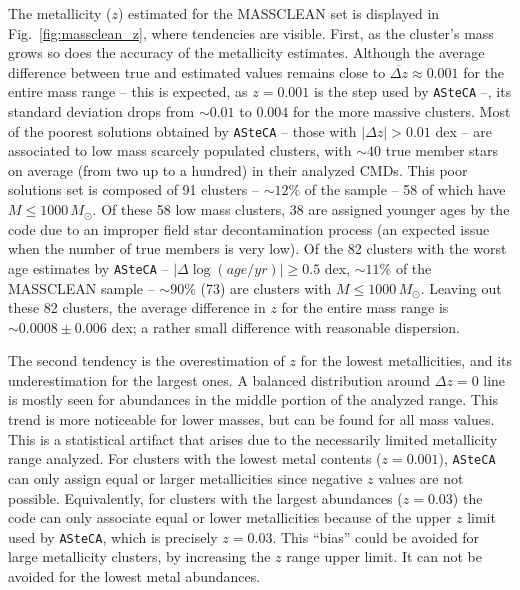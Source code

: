 \documentclass{aa}
\begin{document}
\begin{appendix}
The metallicity ($z$) estimated for the MASSCLEAN set is displayed in
Fig.~\ref{fig:massclean_z}, where tendencies are visible.
%
First, as the cluster's mass grows so does the accuracy of the
metallicity estimates. Although the average difference between true and
estimated values remains close to $\overline{\Delta z}{\approx}0.001$ for the
entire mass range -- this is expected, as $z{=}0.001$ is the step used by
\texttt{ASteCA} --, its standard deviation drops from ${\sim}0.01$ to $0.004$
for the more massive clusters.
%
%
Most of the poorest solutions obtained by \texttt{ASteCA} -- those with
$|\Delta z|{>}0.01$ dex -- are associated to low mass scarcely populated
clusters, with ${\sim}40$ true member stars on average (from two up to a
hundred) in their analyzed CMDs. This poor solutions set is composed of 91
clusters -- ${\sim}12\%$ of the sample -- 58 of which have
$M{\le}1000\,M_{\odot}$.
%
Of these 58 low mass clusters, 38 are assigned younger ages by the code due to
an improper field star decontamination process (an expected issue when the
number of true members is very low).
%
Of the 82 clusters with the worst age estimates by \texttt{ASteCA} --
$|\Delta\log(age/yr)|{\ge}0.5$ dex, ${\sim}11\%$ of the MASSCLEAN sample --
${\sim}90\%$ (73) are clusters with $M{\le}1000\,M_{\odot}$.
%
Leaving out these 82 clusters, the average difference in $z$
for the entire mass range is ${\sim}0.0008{\pm}0.006$ dex; a rather
small difference with reasonable dispersion.

The second tendency is the overestimation of $z$ for the lowest metallicities,
and its underestimation for the largest ones.
A balanced distribution around $\Delta z{=}0$ line is mostly seen for
abundances in the middle portion of the analyzed range. This trend is more
noticeable for lower masses, but can be found for all mass values.
%
This is a statistical artifact that arises due to the necessarily limited
metallicity range analyzed. For clusters with the lowest metal contents ($z
{=}0.001$), \texttt{ASteCA} can only assign equal or larger metallicities since
negative $z$ values are not possible.
Equivalently, for clusters with the largest abundances ($z{=}0.03$) the code
can only associate equal or lower metallicities because of the upper
$z$ limit used by \texttt{ASteCA}, which is precisely $z{=}0.03$.
This ``bias'' could be avoided for large metallicity clusters, by
increasing the $z$ range upper limit. It can not be avoided for the lowest metal
abundances.\\


\end{appendix}
\end{document}
